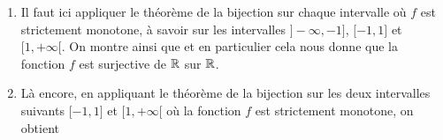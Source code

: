 \documentclass[a4paper, 11pt,reqno]{article}
\begin{document}
\begin{correction}
\begin{enumerate}
\begin{enumerate}
			            Ainsi, par le th\'eor\`eme de la bijection, $f$ r\'ealise une bijection de $\lbrack 1,2\rbrack$ sur $\lbrack -2,2\rbrack$ et donc
			            $$\fbox{$f(\lbrack 1,2\rbrack)=\lbrack -2,2\rbrack.$}$$
			      \item
			            Il faut ici appliquer le th\'eor\`eme de la bijection sur chaque intervalle o\`u $f$ est strictement monotone, \`a savoir sur les intervalles $\rbrack -\infty, -1\rbrack$, $\lbrack -1,1\rbrack$ et $\lbrack 1,+\infty\lbrack$. On montre ainsi que  et en particulier cela nous donne que la fonction $f$ est surjective de $\mathbb{R}$ sur $\mathbb{R}$.
			      \item
			            L\`a encore, en appliquant le th\'eor\`eme de la bijection sur les deux intervalles suivants $\lbrack -1,1\rbrack$ et $\lbrack 1,+\infty\lbrack$ o\`u la fonction $f$ est strictement monotone, on obtient 
		      \end{enumerate}
	\end{enumerate}
\end{correction}
\end{document}
